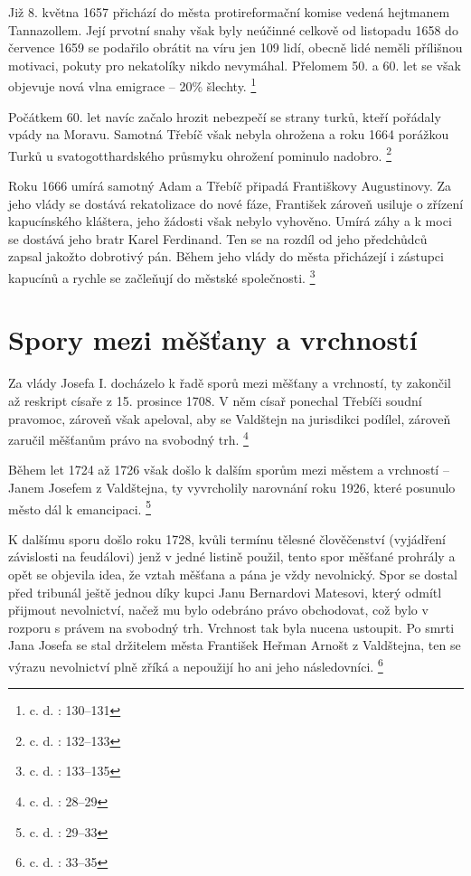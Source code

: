 \documentclass[a4paper,oneside,12p]{report}
\begin{document}
Již 8. května 1657 přichází do města protireformační komise vedená hejtmanem Tannazollem.
Její prvotní snahy však byly neúčinné celkově od listopadu 1658 do července 1659 se podařilo obrátit na  víru jen 109 lidí, obecně lidé neměli přílišnou motivaci, pokuty pro nekatolíky nikdo nevymáhal.
Přelomem 50. a 60. let se však objevuje nová vlna emigrace -- 20\% šlechty. \footnote{c. d. : 130--131}

Počátkem 60. let navíc začalo hrozit nebezpečí se strany turků, kteří pořádaly vpády na Moravu.
Samotná Třebíč však nebyla ohrožena a roku 1664 porážkou Turků u svatogotthardského průsmyku ohrožení pominulo nadobro. \footnote{c. d. : 132--133}

Roku 1666 umírá samotný Adam a Třebíč připadá Františkovy Augustinovy.
Za jeho vlády se dostává rekatolizace do nové fáze, František zároveň usiluje o zřízení kapucínského kláštera, jeho žádosti však nebylo vyhověno.
Umírá záhy a k moci se dostává jeho bratr Karel Ferdinand.
Ten se na rozdíl od jeho předchůdců zapsal jakožto dobrotivý pán.
Během  jeho vlády do města přicházejí i zástupci kapucínů a rychle se začleňují do městské společnosti. \footnote{c. d. : 133--135}

\section{Spory mezi měšťany a vrchností}

Za vlády Josefa I. docházelo k řadě sporů mezi měšťany a vrchností, ty zakončil až reskript císaře z 15. prosince 1708.
V něm císař ponechal Třebíči soudní pravomoc, zároveň však apeloval, aby se Valdštejn na jurisdikci podílel, zároveň zaručil měšťanům právo na svobodný trh.
\footnote{c. d. : 28--29}


Během let 1724 až 1726 však došlo k dalším sporům mezi městem a vrchností -- Janem Josefem z Valdštejna, ty vyvrcholily narovnání roku 1926, které posunulo město dál k emancipaci. %
\footnote{c. d. : 29--33}


K dalšímu sporu došlo roku 1728, kvůli termínu tělesné člověčenství (vyjádření závislosti na feudálovi) jenž v jedné listině použil, tento spor měšťané prohrály a opět se objevila idea, že vztah měšťana a pána je vždy nevolnický.
Spor se dostal před tribunál ještě jednou díky kupci Janu Bernardovi Matesovi, který odmítl přijmout nevolnictví, načež mu bylo odebráno právo obchodovat, což bylo v rozporu s právem na svobodný trh.
Vrchnost tak byla nucena ustoupit.
Po smrti Jana Josefa se stal držitelem města František Heřman Arnošt z Valdštejna, ten se výrazu nevolnictví plně zříká a nepoužijí ho ani jeho následovníci. \footnote{c. d. : 33--35}
\end{document}
